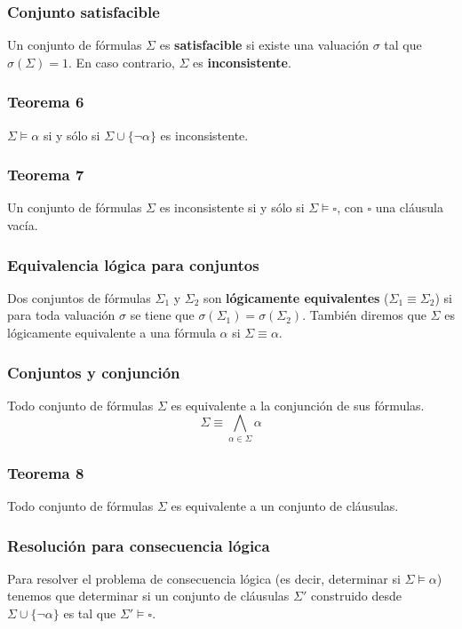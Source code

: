 \begin{multicols}{2}
    \subsubsection*{Conjunto satisfacible}
    Un conjunto de fórmulas $\Sigma$ es \textbf{satisfacible} si existe una valuación $\sigma$ tal que $\sigma(\Sigma) = 1$. En caso contrario, $\Sigma$ es \textbf{inconsistente}.
    
    \subsubsection*{Teorema 6}
    $\Sigma \models \alpha$ si y sólo si $\Sigma \cup \{\neg \alpha\}$ es inconsistente.
    
    \subsubsection*{Teorema 7}
    Un conjunto de fórmulas $\Sigma$ es inconsistente si y sólo si $\Sigma \models \square$, con $\square$ una cláusula vacía.
    
    \subsubsection*{Equivalencia lógica para conjuntos}
    Dos conjuntos de fórmulas $\Sigma_1$ y $\Sigma_2$ son \textbf{lógicamente equivalentes} ($\Sigma_1 \equiv \Sigma_2$) si para toda valuación $\sigma$ se tiene que $\sigma(\Sigma_1) = \sigma(\Sigma_2)$. También diremos que $\Sigma$ es lógicamente equivalente a una fórmula $\alpha$ si $\Sigma \equiv {\alpha}$.
    
    \subsubsection*{Conjuntos y conjunción}
    Todo conjunto de fórmulas $\Sigma$ es equivalente a la conjunción de sus fórmulas.
    $$
        \Sigma \equiv \bigwedge_{\alpha \in \Sigma} \alpha
    $$
    
    \subsubsection*{Teorema 8}
    Todo conjunto de fórmulas $\Sigma$ es equivalente a un conjunto de cláusulas.
    
    \subsubsection*{Resolución para consecuencia lógica}
    Para resolver el problema de consecuencia lógica (es decir, determinar si $\Sigma \models \alpha$) tenemos que determinar si un conjunto de cláusulas $\Sigma'$ construido desde $\Sigma \cup \{\neg \alpha\}$ es tal que $\Sigma' \models \square$.
    

\end{multicols}
